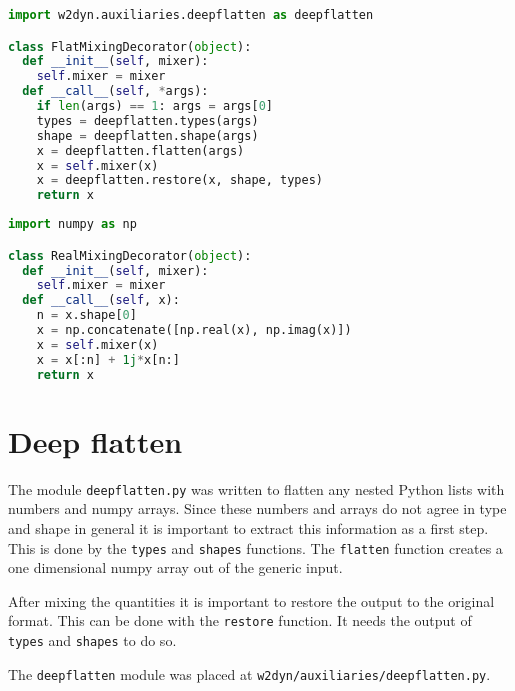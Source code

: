 \begin{lstlisting}[label=lst:flatdec, language=python, caption=Flat mixing decorator]
import w2dyn.auxiliaries.deepflatten as deepflatten

class FlatMixingDecorator(object):
  def __init__(self, mixer):
    self.mixer = mixer
  def __call__(self, *args):
    if len(args) == 1: args = args[0]
    types = deepflatten.types(args)
    shape = deepflatten.shape(args)
    x = deepflatten.flatten(args)
    x = self.mixer(x)
    x = deepflatten.restore(x, shape, types)
    return x
\end{lstlisting}

\begin{lstlisting}[label=lst:realdec, language=python, caption=Real mixing decorator]
import numpy as np

class RealMixingDecorator(object):
  def __init__(self, mixer):
    self.mixer = mixer
  def __call__(self, x):
    n = x.shape[0]
    x = np.concatenate([np.real(x), np.imag(x)])
    x = self.mixer(x)
    x = x[:n] + 1j*x[n:]
    return x
\end{lstlisting}

\section{Deep flatten}
The module \texttt{deepflatten.py} was written to flatten any nested Python lists with numbers and numpy arrays. Since these numbers and arrays do not agree in type and shape in general it is important to extract this information as a first step. This is done by the \texttt{types} and \texttt{shapes} functions. The \texttt{flatten} function creates a one dimensional numpy array out of the generic input.

After mixing the quantities it is important to restore the output to the original format. This can be done with the \texttt{restore} function. It needs the output of \texttt{types} and \texttt{shapes} to do so.

The \texttt{deepflatten} module was placed at \texttt{w2dyn/auxiliaries/deepflatten.py}.

